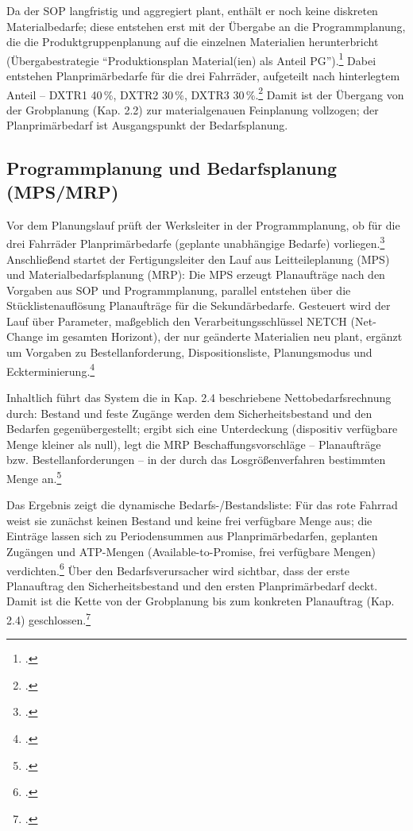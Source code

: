 Da der SOP langfristig und aggregiert plant, enthält er noch keine diskreten Materialbedarfe; diese entstehen erst mit der Übergabe an die Programmplanung, die die Produktgruppenplanung auf die einzelnen Materialien herunterbricht (Übergabestrategie \enquote{Produktionsplan Material(ien) als Anteil PG}).\footcite[Vgl.][S. 18]{Boldau.2023} Dabei entstehen Planprimärbedarfe für die drei Fahrräder, aufgeteilt nach hinterlegtem Anteil -- DXTR1 40\,\%, DXTR2 30\,\%, DXTR3 30\,\%.\footcite[Vgl.][S. 19]{Boldau.2023} Damit ist der Übergang von der Grobplanung (Kap. 2.2) zur materialgenauen Feinplanung vollzogen; der Planprimärbedarf ist Ausgangspunkt der Bedarfsplanung.

\subsection{Programmplanung und Bedarfsplanung (MPS/MRP)}
Vor dem Planungslauf prüft der Werksleiter in der Programmplanung, ob für die drei Fahrräder Planprimärbedarfe (geplante unabhängige Bedarfe) vorliegen.\footcite[Vgl.][S. 20 f.]{Boldau.2023} Anschließend startet der Fertigungsleiter den Lauf aus Leitteileplanung (MPS) und Materialbedarfsplanung (MRP): Die MPS erzeugt Planaufträge nach den Vorgaben aus SOP und Programmplanung, parallel entstehen über die Stücklistenauflösung Planaufträge für die Sekundärbedarfe. Gesteuert wird der Lauf über Parameter, maßgeblich den Verarbeitungsschlüssel NETCH (Net-Change im gesamten Horizont), der nur geänderte Materialien neu plant, ergänzt um Vorgaben zu Bestellanforderung, Dispositionsliste, Planungsmodus und Eckterminierung.\footcite[Vgl.][S. 22]{Boldau.2023}

Inhaltlich führt das System die in Kap. 2.4 beschriebene Nettobedarfsrechnung durch: Bestand und feste Zugänge werden dem Sicherheitsbestand und den Bedarfen gegenübergestellt; ergibt sich eine Unterdeckung (dispositiv verfügbare Menge kleiner als null), legt die MRP Beschaffungsvorschläge -- Planaufträge bzw. Bestellanforderungen -- in der durch das Losgrößenverfahren bestimmten Menge an.\footcite[Vgl.][S. 23]{Boldau.2023}

Das Ergebnis zeigt die dynamische Bedarfs-/Bestandsliste: Für das rote Fahrrad weist sie zunächst keinen Bestand und keine frei verfügbare Menge aus; die Einträge lassen sich zu Periodensummen aus Planprimärbedarfen, geplanten Zugängen und ATP-Mengen (Available-to-Promise, frei verfügbare Mengen) verdichten.\footcite[Vgl.][S. 25 f.]{Boldau.2023} Über den Bedarfsverursacher wird sichtbar, dass der erste Planauftrag den Sicherheitsbestand und den ersten Planprimärbedarf deckt. Damit ist die Kette von der Grobplanung bis zum konkreten Planauftrag (Kap. 2.4) geschlossen.\footcite[Vgl.][S. 27]{Boldau.2023}

